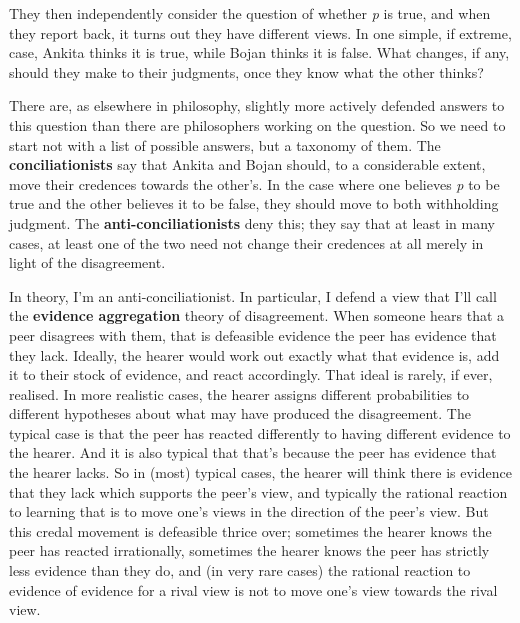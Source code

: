 \documentclass[
  10pt,
  letterpaper,
  twoside]{scrbook}
\begin{document}
They then independently consider the question of whether \emph{p} is
true, and when they report back, it turns out they have different views.
In one simple, if extreme, case, {Ankita} thinks it is true, while
{Bojan} thinks it is false. What changes, if any, should they make to
their judgments, once they know what the other thinks?

There are, as elsewhere in philosophy, slightly more actively defended
answers to this question than there are philosophers working on the
question. So we need to start not with a list of possible answers, but a
taxonomy of them. The \textbf{conciliationists} say that {Ankita} and
{Bojan} should, to a considerable extent, move their credences towards
the other's. In the case where one believes \emph{p} to be true and the
other believes it to be false, they should move to both withholding
judgment. The \textbf{anti-conciliationists} deny this; they say that at
least in many cases, at least one of the two need not change their
credences at all merely in light of the disagreement.

In theory, I'm an anti-conciliationist. In particular, I defend a view
that I'll call the \textbf{evidence aggregation} theory of disagreement.
When someone hears that a peer disagrees with them, that is defeasible
evidence the peer has evidence that they lack. Ideally, the hearer would
work out exactly what that evidence is, add it to their stock of
evidence, and react accordingly. That ideal is rarely, if ever,
realised. In more realistic cases, the hearer assigns different
probabilities to different hypotheses about what may have produced the
disagreement. The typical case is that the peer has reacted differently
to having different evidence to the hearer. And it is also typical that
that's because the peer has evidence that the hearer lacks. So in (most)
typical cases, the hearer will think there is evidence that they lack
which supports the peer's view, and typically the rational reaction to
learning that is to move one's views in the direction of the peer's
view. But this credal movement is defeasible thrice over; sometimes the
hearer knows the peer has reacted irrationally, sometimes the hearer
knows the peer has strictly less evidence than they do, and (in very
rare cases) the rational reaction to evidence of evidence for a rival
view is not to move one's view towards the rival view.
\end{document}
